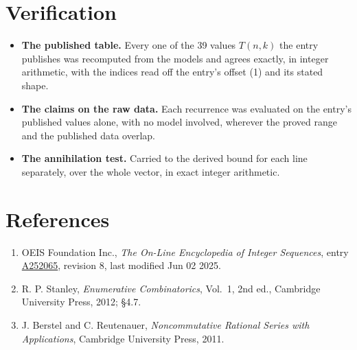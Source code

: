 \documentclass[11pt]{article}
\theoremstyle{definition}
\begin{document}
\section{Verification}

\begin{itemize}

\item {\bfseries The published table.} Every one of the 39 values $T(n,k)$ the entry publishes was recomputed from the models and agrees exactly, in integer arithmetic, with the indices read off the entry's offset (1) and its stated shape.

\item {\bfseries The claims on the raw data.} Each recurrence was evaluated on the entry's published values alone, with no model involved, wherever the proved range and the published data overlap.

\item {\bfseries The annihilation test.} Carried to the derived bound for each line separately, over the whole vector, in exact integer arithmetic.

\end{itemize}

\section{References}

\begin{enumerate}

\item OEIS Foundation Inc., \emph{The On-Line Encyclopedia of Integer Sequences}, entry \href{https://oeis.org/A252065}{A252065}, revision 8, last modified Jun 02 2025.

\item R. P. Stanley, \emph{Enumerative Combinatorics}, Vol.~1, 2nd ed., Cambridge University Press, 2012; \S4.7.

\item J. Berstel and C. Reutenauer, \emph{Noncommutative Rational Series with Applications}, Cambridge University Press, 2011.

\end{enumerate}
\end{document}
